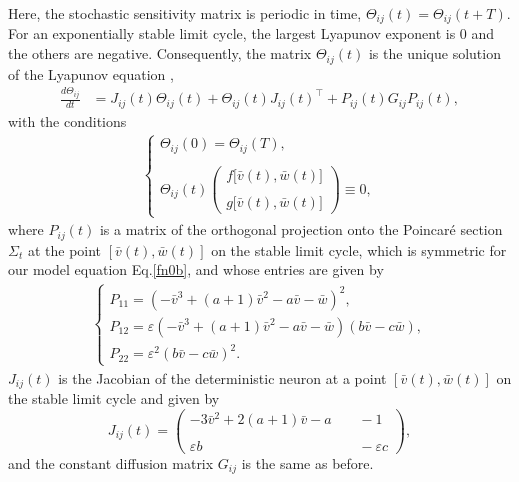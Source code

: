 Here, the stochastic sensitivity matrix is periodic in time,
$\Theta_{ij}(t)=\Theta_{ij}(t+T)$. For an exponentially stable limit cycle, the
largest Lyapunov exponent is $0$ and the others are negative.
Consequently, the matrix $\Theta_{ij}(t)$ is the unique solution
of the Lyapunov equation \cite{Bashkirtseva1}, 
\begin{align}\label{fn57}\nonumber
 \frac{d\Theta_{ij}}{dt}&= J_{ij}(t)\Theta_{ij}(t)+\Theta_{ij}(t)J_{ij}(t)^{\top}+ P_{ij}(t) G_{ij} P_{ij}(t),
\end{align}
with the conditions
\begin{equation}\label{fn58}
\begin{split}
\left\{\begin{array}{lcl}
\Theta_{ij}(0)=\Theta_{ij}(T),\\\\
\Theta_{ij}(t)\left( \begin{array}{c} f\big[\bar{v}(t),\bar{w}(t)\big]\\\\
g\big[\bar{v}(t),\bar{w}(t)\big] \end{array} \right)\equiv 0,
\end{array}\right.
\end{split}
\end{equation} where $P_{ij}(t)$ is a matrix of the orthogonal projection
onto the Poincar\'{e} section $\varSigma_{t}$ at the point
$[\bar{v}(t),\bar{w}(t)]$ on the stable limit cycle, 
which is symmetric for our model equation Eq.\eqref{fn0b},
and whose entries are given by 
\begin{equation}\label{fn59}
\begin{split}
\left\{\begin{array}{lcl}
P_{11}=(-\bar{v}^3+(a+1)\bar{v}^2-a\bar{v}-\bar{w})^2,\\
P_{12}=\varepsilon(-\bar{v}^3+(a+1)\bar{v}^2-a\bar{v}-\bar{w})(b\bar{v}-c\bar{w}),\\
P_{22}=\varepsilon^2(b\bar{v}-c\bar{w})^2.
\end{array}\right.
\end{split}
\end{equation} 
$J_{ij}(t)$ is the Jacobian of the deterministic neuron at a point
$[\bar{v}(t),\bar{w}(t)]$ on the stable limit cycle and
given by \begin{equation}\label{fn60}
 J_{ij}(t)=\left( \begin{array}{cc} -3\bar{v}^2+2(a+1)\bar{v}-a &\:\:\:\:\: -1\\\\
\varepsilon b&\:\:\:\:\: -\varepsilon c\end{array} \right),
\end{equation}
and the constant diffusion matrix $G_{ij}$ is the same as before.

